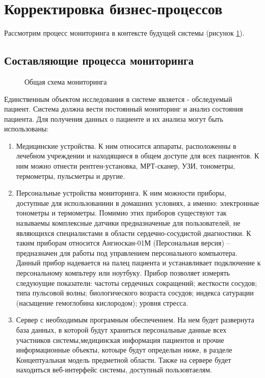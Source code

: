 \newpage
\section{Корректировка бизнес-процессов}
Рассмотрим процесс мониторинга в контексте будущей системы (рисунок
\ref{ris:to_be_main_view}).

\subsection{Составляющие процесса мониторинга}

\begin{figure}[h]
\caption{Общая схема мониторинга}
\label{ris:to_be_main_view}
\end{figure}

Единственным объектом исследования в системе является - обследуемый пациент. Система должна вести постоянный мониторинг и анализ состояния пациента.
Для получения данных о пациенте и их анализа могут быть использованы:

\begin{enumerate}
  \item Медицинские устройства. К ним относится аппараты, расположенны в
  лечебном учреждении и находящиеся в общем доступе для всех пациентов. К ним можно отнести рентген-установка, МРТ-сканер, УЗИ, тонометры, термометры, пульсметры и другие.
  \item Персональные устройства мониторинга. К ним можности приборы, доступные
  для использованиии в домашних условиях, а именно: электронные тонометры и термометры. Помимио этих приборов существуют так называемы комплексные датчики предназначеные для пользователей, не являющихся специалистами в области сердечно-сосудистой диагностики. К таким приборам относится Ангиоскан-01М (Персональная версия) – предназначен для работы под управлением персонального компьютера. Данный прибор надевается на палец пациента и устанавливает подключение к персональному компьтеру или ноутбуку. Прибор позволяет измерять следуюущие показатели: частоты сердечных сокращений; жесткости сосудов; типа пульсовой волны; биологического возраста сосудов; индекса сатурации (насыщение гемоглобина кислородом); уровня стресса.
  \item Сервер с необходимым програмным обеспечением. На нем будет развернута
  база данных, в которой будут храниться персональные данные всех участников системы,медицинская информация пациентов и прочие информационные объекты, котоыре будут определын ниже,  в разделе Концептуальная модель предметной области. Также на сервере будет находиться веб-интерфейс системы, доступный пользовтаелям.
\end{enumerate}


